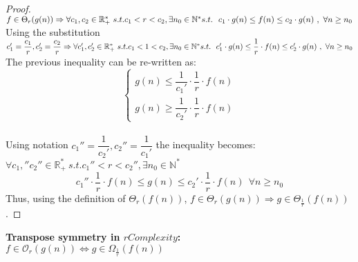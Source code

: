 \begin{proof}
    $ f \in \Theta_{r}(g(n)) \Rightarrow \forall c_{1}, c_{2} \in \mathbb{R}^{*}_{+} \ s.t. c_{1}< r < c_{2} , \exists n_{0} \in \mathbb{N}^{*}\ \\ s.t.\ \ c_{1} \cdot g(n) \leq f(n) \leq c_{2} \cdot g(n)\ ,\  \forall n \geq n_{0} $
    \\ Using the substitution $c_{1}' = \dfrac{c_{1}}{r}, c_{2}' = \dfrac{c_{2}}{r} \Rightarrow \forall c_{1}', c_{2}' \in \mathbb{R}^{*}_{+} \ s.t. c_{1} < 1 < c_{2} , \exists n_{0} \in \mathbb{N}^{*}\ \\ s.t.\ \ c_{1}' \cdot g(n) \leq \dfrac{1}{r} \cdot f(n) \leq c_{2}' \cdot g(n)\ ,\  \forall n \geq n_{0} $
    \\ The previous inequality can be re-written as:
    \[\begin{cases}
          g(n) \leq \dfrac{1}{c_{1}'} \cdot \dfrac{1}{r} \cdot f(n) \\ g(n) \geq \dfrac{1}{c_{2}'} \cdot \dfrac{1}{r} \cdot f(n)
    \end{cases}\]
    \\ Using notation $c_{1}'' = \dfrac{1}{c_{2}'}, c_{2}'' = \dfrac{1}{c_{1}'}$ the inequality becomes:  \\
    $\forall c_{1},'' c_{2}'' \in \mathbb{R}^{*}_{+} \ s.t. c_{1}'' < r < c_{2}'' , \exists n_{0} \in \mathbb{N}^{*}\ $
    \[ {c_{1}''} \cdot \dfrac{1}{r} \cdot f(n) \leq g(n) \leq {c_{2}'} \cdot \dfrac{1}{r} \cdot f(n)\ \ \forall n \geq n_{0} \]
    Thus, using the definition of $ \Theta_{r}(f(n))$, $ f \in \Theta_{r}(g(n)) \Rightarrow g \in \Theta_{\frac{1}{r}}(f(n)) $.
\end{proof}


\begin{theorem}
    \textbf{Transpose symmetry in $rComplexity$:}  \\  $ f \in \mathcal{O}_{r}(g(n)) \Leftrightarrow g \in \Omega_{\frac{1}{r}}(f(n)) $
\end{theorem}

